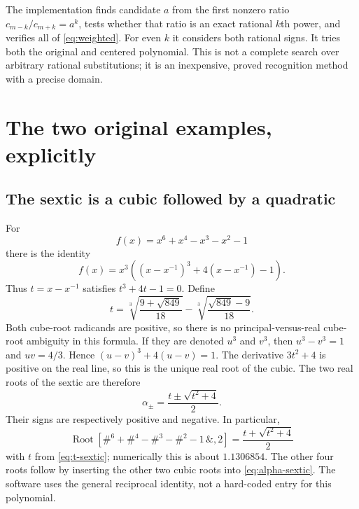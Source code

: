 \documentclass[11pt,a4paper]{article}
\theoremstyle{definition}
\theoremstyle{remark}
\begin{document}
The implementation finds candidate $a$ from the first nonzero ratio
$c_{m-k}/c_{m+k}=a^k$, tests whether that ratio is an exact rational $k$th power,
and verifies all of \eqref{eq:weighted}. For even $k$ it considers both rational
signs. It tries both the original and centered polynomial. This is not a
complete search over arbitrary rational substitutions; it is an inexpensive,
proved recognition method with a precise domain.

\section{The two original examples, explicitly}
\label{sec:examples}
\subsection{The sextic is a cubic followed by a quadratic}
For
\[
 f(x)=x^6+x^4-x^3-x^2-1
\]
there is the identity
\begin{equation}\label{eq:original-sextic}
 f(x)=x^3\left((x-x^{-1})^3+4(x-x^{-1})-1\right).
\end{equation}
Thus $t=x-x^{-1}$ satisfies $t^3+4t-1=0$. Define
\begin{equation}\label{eq:t-sextic}
 t=\sqrt[3]{\frac{9+\sqrt{849}}{18}}
   -\sqrt[3]{\frac{\sqrt{849}-9}{18}}.
\end{equation}
Both cube-root radicands are positive, so there is no principal-versus-real
cube-root ambiguity in this formula. If they are denoted $u^3$ and $v^3$, then
$u^3-v^3=1$ and $uv=4/3$. Hence $(u-v)^3+4(u-v)=1$.
The derivative $3t^2+4$ is positive on the real line, so this is the unique real
root of the cubic. The two real roots of the sextic are therefore
\begin{equation}\label{eq:alpha-sextic}
 \alpha_\pm=\frac{t\pm\sqrt{t^2+4}}2.
\end{equation}
Their signs are respectively positive and negative. In particular,
\[
 \boxed{\operatorname{Root}[\#^6+\#^4-\#^3-\#^2-1\,\&,2]
       =\frac{t+\sqrt{t^2+4}}2}
\]
with $t$ from \eqref{eq:t-sextic}; numerically this is about $1.1306854$.
The other four roots follow by inserting the other two cubic roots into
\eqref{eq:alpha-sextic}. The software uses the general reciprocal identity,
not a hard-coded entry for this polynomial.
\end{document}

